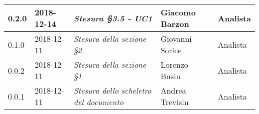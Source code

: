 \begin{longtable}{C{2cm}|C{2.5cm}|C{4.5cm}|C{2.5cm}|C{3cm}}
		0.2.0 & 2018-12-14 & \emph{Stesura §3.5 - UC1} & Giacomo Barzon & Analista \\
		\hline
		
		0.1.0 & 2018-12-11 & \emph{Stesura della sezione §2} & Giovanni Sorice & Analista \\
		\hline
		
		0.0.2 & 2018-12-11 & \emph{Stesura della sezione §1} & Lorenzo Busin & Analista \\
		\hline
		
		0.0.1 & 2018-12-11 & \emph{Stesura dello scheletro del documento} & Andrea Trevisin & Analista \\
		
	\end{longtable}



\clearpage